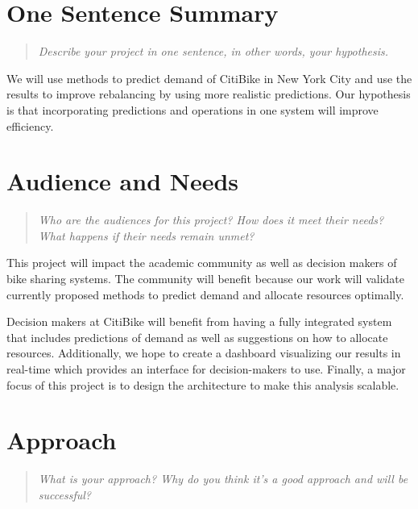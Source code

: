 \documentclass{proc}
\begin{document}
\section{One Sentence Summary}
\begin{quote}
\emph{Describe your project in one sentence, in other words, your hypothesis.}
\end{quote}

We will use methods to predict demand of CitiBike in New York City and use the results to improve rebalancing by using more realistic predictions. Our hypothesis is that incorporating predictions and operations in one system will improve efficiency. 

\section{Audience and Needs}
\begin{quote}
\emph{Who are the audiences for this project? 
How does it meet their needs? 
What happens if their needs remain unmet?}
\end{quote}

This project will impact the academic community as well as decision makers of bike sharing systems. The community will benefit because our work will validate currently proposed methods to predict demand and allocate resources optimally. 

Decision makers at CitiBike will benefit from having a fully integrated system that includes predictions of demand as well as suggestions on how to allocate resources. Additionally, we hope to create a dashboard visualizing our results in real-time which provides an interface for decision-makers to use. Finally, a major focus of this project is to design the architecture to make this analysis scalable. 

\section{Approach}
\begin{quote}
\emph{What is your approach?
Why do you think it's a good approach and will be successful?}
\end{quote}
\end{document}
